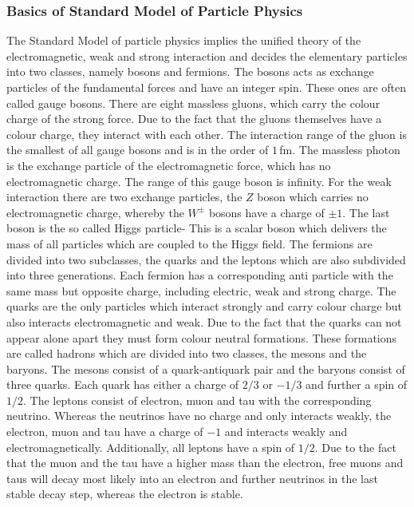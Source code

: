 \documentclass[10pt, a4paper, notitlepage, DIV=15]{scrartcl}
\begin{document}
\subsubsection{Basics of Standard Model of Particle Physics}
The Standard Model of particle physics implies the unified theory of the electromagnetic, weak and strong interaction and decides the elementary particles into two classes, namely bosons and fermions. \newline
The bosons acts as exchange particles of the fundamental forces and have an integer spin. These ones are often called gauge bosons. There are eight massless gluons, which carry the colour charge of the strong force. Due to the fact that the gluons themselves have a colour charge, they interact with each other. The interaction range of the gluon is the smallest of all gauge bosons and is in the order of $1\,$fm. The massless photon is the exchange particle of the electromagnetic force, which has no electromagnetic charge. The range of this gauge boson is infinity. For the weak interaction there are two exchange particles, the $Z$ boson which carries no electromagnetic charge, whereby the $W^{\pm}$ bosons have a charge of $\pm 1$. The last boson is the so called Higgs particle- This is a scalar boson which delivers the mass of all particles which are coupled to the Higgs field.  \newline
The fermions are divided into two subclasses, the quarks and the leptons which are also subdivided into three generations. Each fermion has a corresponding anti particle with the same mass but opposite charge, including electric, weak and strong charge.\newline
The quarks are the only particles which interact strongly and carry colour charge but also interacts electromagnetic and weak. Due to the fact that the quarks can not appear alone apart they must form colour neutral formations. These formations are called hadrons which are divided into two classes, the mesons and the baryons. The mesons consist of a quark-antiquark pair and the baryons consist of three quarks. Each quark has either a charge of $2/3$ or $-1/3$ and further a spin of $1/2$. 
\newline
The leptons consist of electron, muon and tau with the corresponding neutrino. Whereas the neutrinos have no charge and only interacts weakly, the electron, muon and tau have a charge of $-1$ and interacts weakly and electromagnetically. Additionally, all leptons have a spin of $1/2$. Due to the fact that the muon and the tau have a higher mass than the electron, free muons and taus will decay most likely into an electron and further neutrinos in the last stable decay step, whereas the electron is stable. \cite{povh}
\end{document}
